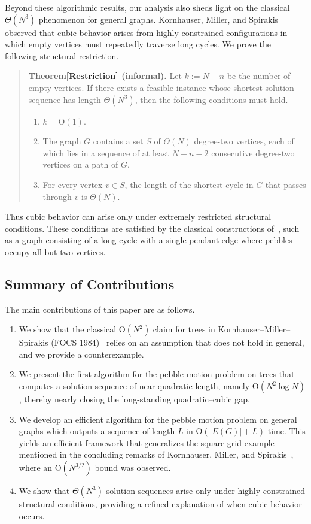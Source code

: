 \documentclass[letter,11pt]{article}
\theoremstyle{definition}
\theoremstyle{definition}
\newcommand{\1}{\boldmath$~1~$\unboldmath}
\newcommand{\Ord}{\mathrm{O}}
\newcommand{\tume}{\hspace*{0.2em}}
\begin{document}
Beyond these algorithmic results, our analysis also sheds light on
the classical $\Theta(N^3)$ phenomenon for general graphs.
Kornhauser, Miller, and Spirakis~\cite{715921} observed that cubic behavior arises
from highly constrained configurations in which empty vertices must
repeatedly traverse long cycles.
We prove the following structural restriction.
\begin{quote}
\textbf{Theorem\tume\ref{Restriction} (informal).}
Let $k:=N-n$ be the number of empty vertices.
If there exists a feasible instance whose shortest solution
sequence has length $\Theta(N^3)$, then the following conditions must hold.
\begin{enumerate}
\item $k=\Ord(1)$.
\item The graph $G$ contains a set $S$ of $\Theta(N)$ degree-two vertices,
each of which lies in a sequence of at least $N-n-2$ consecutive
degree-two vertices on a path of $G$.\label{CLL3}
\item For every vertex $v \in S$, the length of the shortest cycle in $G$
that passes through $v$ is $\Theta(N)$.
\end{enumerate}
\end{quote}
Thus cubic behavior can arise only under extremely restricted
structural conditions.
These conditions are satisfied by the classical constructions
of~\cite{715921}, such as a graph consisting of a long cycle
with a single pendant edge where pebbles occupy all but two
vertices.


\subsection{Summary of Contributions}

The main contributions of this paper are as follows.
\begin{enumerate}
\item We show that the classical $\Ord(N^2)$ claim for trees in
	Kornhauser–Miller–Spirakis (FOCS 1984)~\cite{715921} relies 
	on an assumption that does not hold in general, and we provide 
	a counterexample. 

\item We present the first algorithm for the pebble motion problem on
	trees that computes a solution sequence of near-quadratic length,
	namely $\Ord(N^2\log N)$, thereby nearly closing the long-standing
	quadratic--cubic gap.

\item We develop an efficient algorithm for the pebble motion problem on general 
      graphs which outputs a sequence of length $L$ in $\Ord(|E(G)| + L)$ time.
      This yields an efficient framework that generalizes the
      square-grid example mentioned in the concluding remarks of
      Kornhauser, Miller, and Spirakis~\cite{715921}, where an
      $\Ord(N^{3/2})$ bound was observed.

\item We show that $\Theta(N^3)$ solution sequences arise only under
      highly constrained structural conditions, providing a refined
      explanation of when cubic behavior occurs.
\end{enumerate}
\end{document}
